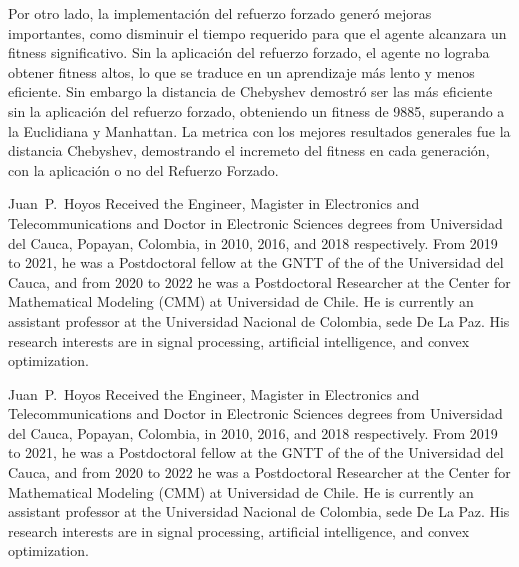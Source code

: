 \documentclass[lettersize, journal]{IEEEtran}
\begin{document}
Por otro lado, la implementación del refuerzo forzado generó mejoras importantes, como disminuir el tiempo requerido para que el agente alcanzara un fitness significativo. Sin la aplicación del refuerzo forzado, el agente no lograba obtener fitness altos, lo que se traduce en un aprendizaje más lento y menos eficiente. Sin embargo la distancia de Chebyshev demostró ser las más eficiente sin la aplicación del refuerzo forzado, obteniendo un fitness de 9885, superando a la Euclidiana y Manhattan. La metrica con los mejores resultados generales fue la distancia Chebyshev, demostrando el incremeto del fitness en cada generación, con la aplicación o no del Refuerzo Forzado.
\printbibliography
\vspace{-2cm}
\begin{IEEEbiography}{Juan~P.~Hoyos}
Received the Engineer, Magister in Electronics and Telecommunications and Doctor in Electronic Sciences degrees from Universidad del Cauca, Popayan, Colombia, in 2010, 2016, and 2018 respectively. From 2019 to 2021, he was a Postdoctoral fellow at the GNTT of the of the Universidad del Cauca, and from 2020 to 2022 he was a Postdoctoral Researcher at the Center for Mathematical Modeling (CMM) at Universidad de Chile. He is currently an assistant professor at the Universidad Nacional de Colombia, sede De La Paz. His research interests are in signal processing, artificial intelligence, and convex optimization.
\end{IEEEbiography}
\vspace{-2.5cm}
\begin{IEEEbiography}{Juan~P.~Hoyos}
Received the Engineer, Magister in Electronics and Telecommunications and Doctor in Electronic Sciences degrees from Universidad del Cauca, Popayan, Colombia, in 2010, 2016, and 2018 respectively. From 2019 to 2021, he was a Postdoctoral fellow at the GNTT of the of the Universidad del Cauca, and from 2020 to 2022 he was a Postdoctoral Researcher at the Center for Mathematical Modeling (CMM) at Universidad de Chile. He is currently an assistant professor at the Universidad Nacional de Colombia, sede De La Paz. His research interests are in signal processing, artificial intelligence, and convex optimization.
\end{IEEEbiography}
\end{document}
